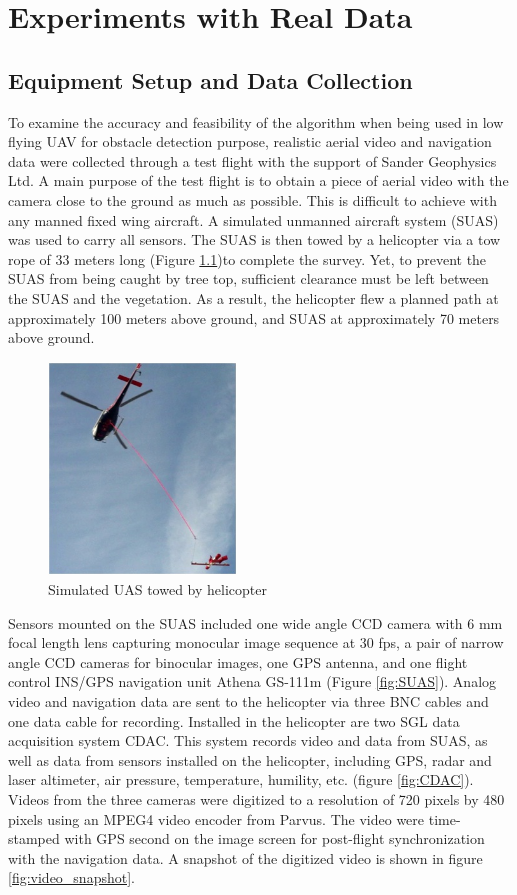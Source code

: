 \chapter{Experiments with Real Data}
\section{Equipment Setup and Data Collection}
To examine the accuracy and feasibility of the algorithm when
being used in low flying UAV for obstacle detection purpose, realistic
aerial video and navigation data were collected through a test flight
with the support of Sander Geophysics Ltd. A main purpose of the test
flight is to obtain a piece of aerial video with the camera close to
the ground as much as possible. This is difficult to achieve with any
manned fixed wing aircraft. A simulated unmanned aircraft system
(SUAS) was used to carry all sensors. The SUAS is then towed by a
helicopter via a tow rope of 33 meters long (Figure
\ref{fig:towedSUAS})to complete the survey. Yet, to prevent the SUAS
from being caught by tree top, sufficient clearance must be left
between the SUAS and the vegetation. As a result, the helicopter flew
a planned path at approximately 100 meters above ground, and SUAS at
approximately 70 meters above ground.

\begin{figure}[h]
\centering
\includegraphics[width=5cm,keepaspectratio=true]{./Figures/towed_SUAS.jpg}
\caption{Simulated UAS towed by helicopter}
\label{fig:towedSUAS}
\end{figure}
\FloatBarrier

Sensors mounted on the SUAS included one wide angle CCD camera with 6
mm focal length lens capturing monocular image sequence at 30 fps, a
pair of narrow angle CCD cameras for binocular images, one GPS
antenna, and one flight control INS/GPS navigation unit Athena GS-111m
\cite{_athena_????} (Figure \ref{fig:SUAS}). Analog video and
navigation data are sent to the helicopter via three BNC cables and
one data cable for recording. Installed in the helicopter are two SGL
data acquisition system CDAC. This system records video and data from
SUAS, as well as data from sensors installed on the helicopter,
including GPS, radar and laser altimeter, air pressure, temperature,
humility, etc. (figure \ref{fig:CDAC}). Videos from the three cameras
were digitized to a resolution of 720 pixels by 480 pixels using an
MPEG4 video encoder from Parvus. The video were time-stamped with GPS
second on the image screen for post-flight synchronization with the
navigation data. A snapshot of the digitized video is shown in figure
\ref{fig:video_snapshot}.

